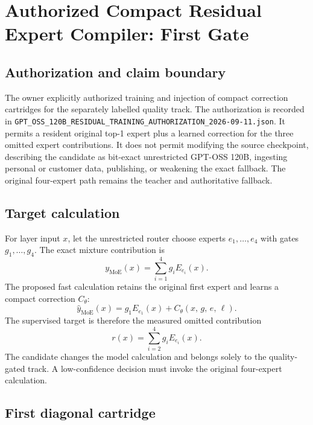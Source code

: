 \section{Authorized Compact Residual Expert Compiler: First Gate}
\label{sec:gptoss120b-residual-first-gate}

\subsection{Authorization and claim boundary}

The owner explicitly authorized training and injection of compact correction
cartridges for the separately labelled quality track.  The authorization is
recorded in
\texttt{GPT\_OSS\_120B\_RESIDUAL\_TRAINING\_AUTHORIZATION\_2026-09-11.json}.
It permits a resident original top-1 expert plus a learned correction for the
three omitted expert contributions.  It does not permit modifying the source
checkpoint, describing the candidate as bit-exact unrestricted GPT-OSS 120B,
ingesting personal or customer data, publishing, or weakening the exact
fallback.  The original four-expert path remains the teacher and authoritative
fallback.

\subsection{Target calculation}

For layer input $x$, let the unrestricted router choose experts $e_1,\ldots,e_4$
with gates $g_1,\ldots,g_4$.  The exact mixture contribution is
\begin{equation}
  y_{\mathrm{MoE}}(x)=\sum_{i=1}^{4}g_i E_{e_i}(x).
\end{equation}
The proposed fast calculation retains the original first expert and learns a
compact correction $C_\theta$:
\begin{equation}
  \widehat y_{\mathrm{MoE}}(x)=g_1 E_{e_1}(x)+
  C_\theta\!\left(x,\,g,\,e,\,\ell\right).
\end{equation}
The supervised target is therefore the measured omitted contribution
\begin{equation}
  r(x)=\sum_{i=2}^{4}g_i E_{e_i}(x).
\end{equation}
The candidate changes the model calculation and belongs solely to the
quality-gated track.  A low-confidence decision must invoke the original
four-expert calculation.

\subsection{First diagonal cartridge}

